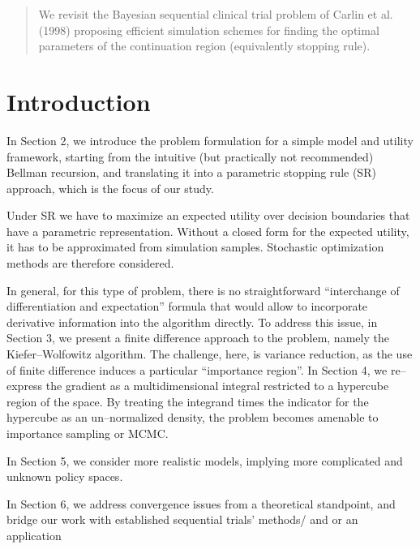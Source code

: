 \documentclass[11pt]{article}
\begin{document}
\begin{abstract}
We revisit the Bayesian sequential clinical trial problem of Carlin
et al. (1998) proposing efficient simulation schemes for finding the
optimal parameters of the continuation region (equivalently stopping
rule).
\end{abstract}

\section{Introduction}
In Section 2, we introduce the problem formulation for a simple
model and utility framework, starting from the intuitive (but
practically not recommended) Bellman recursion, and translating it
into a parametric stopping rule (SR) approach, which is the focus of
our study.

Under SR we have to maximize an expected utility over decision
boundaries  that have a parametric representation. Without a closed
form for the expected utility, it has to be approximated from
simulation samples. Stochastic optimization methods are therefore
considered.

In general, for this type of problem, there is no straightforward
``interchange of differentiation and expectation'' formula that
would allow to incorporate derivative information into the algorithm
directly. To address this issue, in Section 3, we present a finite
difference approach to the problem, namely the Kiefer--Wolfowitz
algorithm. The challenge, here, is variance reduction, as the use of
finite difference induces a particular ``importance region''. In
Section 4, we re--express the gradient as a multidimensional
integral restricted to a hypercube region of the space. By treating
the integrand times the indicator for the hypercube as an
un--normalized density, the problem becomes amenable to importance
sampling or MCMC.

In Section 5, we consider more realistic models, implying more
complicated and unknown policy spaces.

In Section 6, we address convergence issues from a theoretical
standpoint, and bridge our work with established sequential trials'
methods/ and or an application
\end{document}
